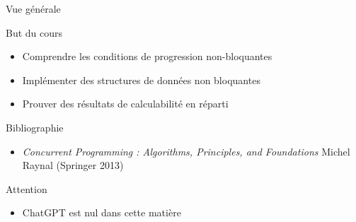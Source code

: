 
\begingroup

\begin{frame}{Vue générale}

  \begin{alertblock}{But du cours}
    \begin{itemize}
    \item Comprendre les conditions de progression non-bloquantes
    \item Implémenter des structures de données non bloquantes
    \item Prouver des résultats de calculabilité en réparti
    \end{itemize}
  \end{alertblock}

  \begin{block}{Bibliographie}
    \begin{itemize}
    \item \emph{Concurrent Programming : Algorithms, Principles, and Foundations} Michel Raynal (Springer 2013)
    \end{itemize}
  \end{block}
  
  \begin{alertblock}{Attention}
    \begin{itemize}
    \item ChatGPT est nul dans cette matière
    \end{itemize}
  \end{alertblock}


\end{frame}

\endgroup
\endinput
